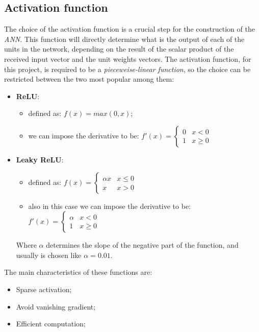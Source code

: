 \subsection{Activation function}
The choice of the activation function is a crucial step for the construction of the \textit{ANN}. This function will directly determine what is the output of each of the units in the network, depending on the result of the scalar product of the received input vector and the unit weights vectors.\newline
The activation function, for this project, is required to be a \textit{pieceweise-linear function}, so the choice can be restricted between the two most popular among them:
\begin{itemize}
    \item \textbf{ReLU}:
        \begin{itemize}
            \item defined as: $f(x) = max(0,x)$;
            \item we can impose the derivative to be:
            $f'(x) = \begin{cases} 
                0 & x<0 \\
                1 & x\geq 0 
                \end{cases}$
        \end{itemize}
    \item \textbf{Leaky ReLU}:
        \begin{itemize}
            \item defined as:
            $f(x) = \begin{cases}
                \alpha x & x\leq 0 \\
                x & x>0
            \end{cases}$
            \item also in this case we can impose the derivative to be:
            $f'(x) = \begin{cases}
                \alpha & x<0 \\
                1 & x\geq0
            \end{cases}$
        \end{itemize}
        Where $\alpha$ determines the slope of the negative part of the function, and usually is chosen like $\alpha=0.01$.\newline
\end{itemize}
The main characteristics of these functions are:
\begin{itemize}
    \item Sparse activation;
    \item Avoid vanishing gradient;
    \item Efficient computation;
\end{itemize}
